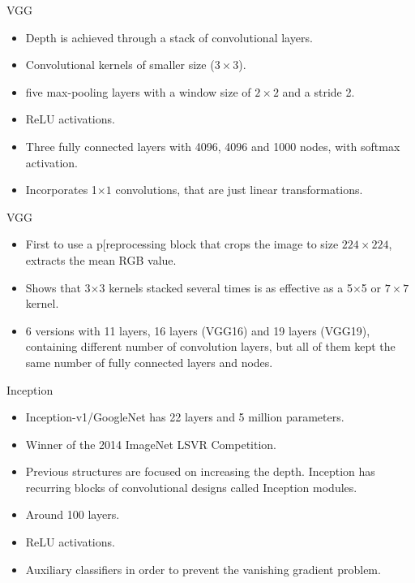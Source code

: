 \documentclass{beamer}
\begin{document}
\begin{frame}{VGG}
\begin{itemize}
    \item  Depth is achieved through a stack of convolutional layers. 
    \item Convolutional kernels of smaller size ($3\times 3$).
    \item five max-pooling layers with a window size of $2\times2$ and a stride 2. 
    \item ReLU activations. 
    \item Three fully connected layers with 4096, 4096 and 1000 nodes, with softmax activation.
    \item Incorporates 1$\times1$ convolutions, that are just linear transformations. 
\end{itemize}
\end{frame}
\begin{frame}{VGG}
\begin{itemize}
    \item First to use a p[reprocessing block that crops the image to size $224\times224$, extracts the mean RGB value.
    \item Shows that 3$\times$3 kernels stacked several times is as effective as a 5$\times$5 or $7\times7$ kernel. 
    \item 6 versions with 11 layers, 16 layers (VGG16) and 19 layers (VGG19), containing different number of convolution layers, but all of them kept the same number of fully connected layers and nodes.
\end{itemize}
   
\end{frame}

\begin{frame}{Inception}
    \begin{itemize}
        \item Inception-v1/GoogleNet has 22 layers and 5 million parameters. 
        \item Winner of the 2014 ImageNet LSVR Competition. 
        \item Previous structures are focused on increasing the depth. Inception has recurring blocks of convolutional designs called Inception modules. 
        \item Around 100 layers. 
        \item ReLU activations. 
        \item Auxiliary classifiers in order to prevent the vanishing gradient problem.
    \end{itemize}
\end{frame}
\end{document}
